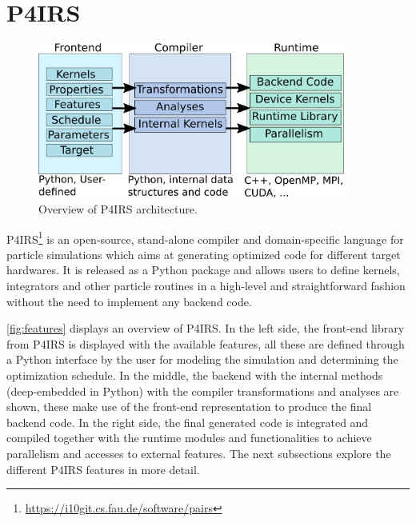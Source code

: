 \documentclass[preprint,12pt]{elsarticle}
\begin{document}
\section{P4IRS}
\label{sec:pairs}


\begin{figure}[htb]
  \centering
  \includegraphics[width=0.9\textwidth]{pairs_overview.png}
  \caption{Overview of P4IRS architecture.}
  \label{fig:features}
\end{figure}

P4IRS\footnote{\url{https://i10git.cs.fau.de/software/pairs}} is an open-source, stand-alone compiler and domain-specific language for particle simulations which aims at generating optimized code for different target hardwares.
It is released as a Python package and allows users to define kernels, integrators and other particle routines in a high-level and straightforward fashion without the need to implement any backend code.

\autoref{fig:features} displays an overview of P4IRS.
In the left side, the front-end library from P4IRS is displayed with the available features, all these are defined through a Python interface by the user for modeling the simulation and determining the optimization schedule.
In the middle, the backend with the internal methods (deep-embedded in Python) with the compiler transformations and analyses are shown, these make use of the front-end representation to produce the final backend code.
In the right side, the final generated code is integrated and compiled together with the runtime modules and functionalities to achieve parallelism and accesses to external features.
The next subsections explore the different P4IRS features in more detail.
\end{document}
